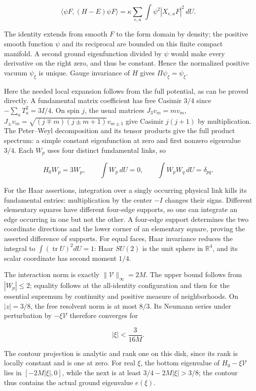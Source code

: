 \documentclass[
  11pt,
]{article}
\begin{document}
\[
\langle\psi F,(H-E)\psi F\rangle
=\kappa\sum_{e,a}\int\psi^2|X_{e,a}F|^2\,dU.
\tag{3.1}
\]

The identity extends from smooth \(F\) to the form domain by density;
the positive smooth function \(\psi\) and its reciprocal are bounded on
this finite compact manifold. A second ground eigenfunction divided by
\(\psi\) would make every derivative on the right zero, and thus be
constant. Hence the normalized positive vacuum \(\psi_\xi\) is unique.
Gauge invariance of \(H\) gives \(\Pi\psi_\xi=\psi_\xi\).

Here the needed local expansion follows from the full potential, as can
be proved directly. A fundamental matrix coefficient has free Casimir
\(3/4\) since \(-\sum_aT_a^2=3I/4\). On spin \(j\), the usual matrices
\(J_3v_m=mv_m\), \(J_\pm v_m=\sqrt{(j\mp m)(j\pm m+1)}v_{m\pm1}\) give
Casimir \(j(j+1)\) by multiplication. The Peter--Weyl decomposition and
its tensor products give the full product spectrum: a simple constant
eigenfunction at zero and first nonzero eigenvalue \(3/4\). Each \(W_p\)
uses four distinct fundamental links, so

\[
H_0W_p=3W_p,\qquad
\int W_p\,dU=0,\qquad
\int W_pW_q\,dU=\delta_{pq}.
\tag{3.2}
\]

For the Haar assertions, integration over a singly occurring physical
link kills its fundamental entries: multiplication by the center \(-I\)
changes their signs. Different elementary squares have different
four-edge supports, so one can integrate an edge occurring in one but
not the other. A four-edge support determines the two coordinate
directions and the lower corner of an elementary square, proving the
asserted difference of supports. For equal faces, Haar invariance
reduces the integral to \(\int(\operatorname{tr}U)^2dU=1\): Haar
\(SU(2)\) is the unit sphere in \(\mathbb R^4\), and its scalar
coordinate has second moment \(1/4\).

The interaction norm is exactly \(\|\mathcal V\|_\infty=2M\). The upper
bound follows from \(|W_p|\le2\); equality follows at the all-identity
configuration and then for the essential supremum by continuity and
positive measure of neighborhoods. On \(|z|=3/8\), the free resolvent
norm is at most \(8/3\). Its Neumann series under perturbation by
\(-\xi\mathcal V\) therefore converges for

\[
\boxed{|\xi|<\frac3{16M}.}
\tag{3.3}
\]

The contour projection is analytic and rank one on this disk, since its
rank is locally constant and is one at zero. For real \(\xi\), the
bottom eigenvalue of \(H_0-\xi\mathcal V\) lies in \([-2M|\xi|,0]\),
while the next is at least \(3/4-2M|\xi|>3/8\); the contour thus
contains the actual ground eigenvalue \(e(\xi)\).
\end{document}
